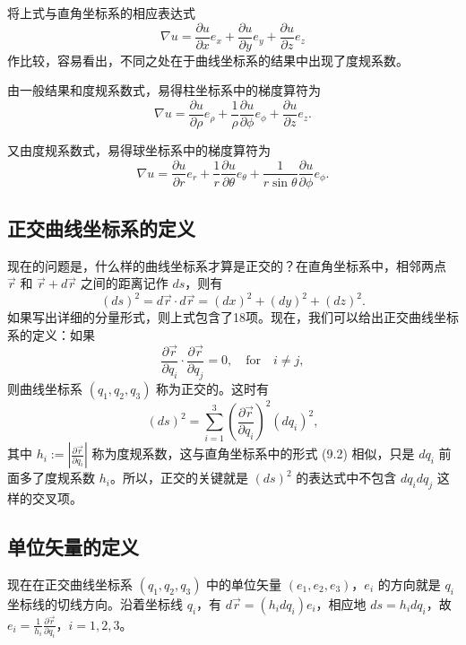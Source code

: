 将上式与直角坐标系的相应表达式
\begin{equation}
\nabla u = \frac{\partial u}{\partial x} e_x + \frac{\partial u}{\partial y} e_y + \frac{\partial u}{\partial z} e_z
\end{equation}
作比较，容易看出，不同之处在于曲线坐标系的结果中出现了度规系数。

由一般结果和度规系数式，易得柱坐标系中的梯度算符为
\begin{equation}
\nabla u = \frac{\partial u}{\partial \rho} e_\rho + \frac{1}{\rho} \frac{\partial u}{\partial \phi} e_\phi + \frac{\partial u}{\partial z} e_z.
\end{equation}

又由度规系数式，易得球坐标系中的梯度算符为
\begin{equation}
\nabla u = \frac{\partial u}{\partial r} e_r + \frac{1}{r} \frac{\partial u}{\partial \theta} e_\theta + \frac{1}{r \sin \theta} \frac{\partial u}{\partial \phi} e_\phi.
\end{equation}


\subsection{正交曲线坐标系的定义}

现在的问题是，什么样的曲线坐标系才算是正交的？在直角坐标系中，相邻两点 $\vec{r}$ 和 $\vec{r} + d\vec{r}$ 之间的距离记作 $ds$，则有
\[
(ds)^2 = d\vec{r} \cdot d\vec{r} = (dx)^2 + (dy)^2 + (dz)^2.
\]
如果写出详细的分量形式，则上式包含了18项。现在，我们可以给出正交曲线坐标系的定义：如果
\[
\frac{\partial \vec{r}}{\partial q_i} \cdot \frac{\partial \vec{r}}{\partial q_j} = 0, \quad \text{for} \quad i \neq j,
\]
则曲线坐标系 $(q_1, q_2, q_3)$ 称为正交的。这时有
\[
(ds)^2 = \sum_{i=1}^3 \left( \frac{\partial \vec{r}}{\partial q_i} \right)^2 (dq_i)^2,
\]
其中 $h_i := \left| \frac{\partial \vec{r}}{\partial q_i} \right|$ 称为度规系数，这与直角坐标系中的形式 (9.2) 相似，只是 $dq_i$ 前面多了度规系数 $h_i$。所以，正交的关键就是 $(ds)^2$ 的表达式中不包含 $dq_i dq_j$ 这样的交叉项。

\subsection{单位矢量的定义}

现在在正交曲线坐标系 $(q_1, q_2, q_3)$ 中的单位矢量 $(e_1, e_2, e_3)$，$e_i$ 的方向就是 $q_i$ 坐标线的切线方向。沿着坐标线 $q_i$，有 $d\vec{r} = (h_i dq_i) e_i$，相应地 $ds = h_i dq_i$，故 $e_i = \frac{1}{h_i} \frac{\partial \vec{r}}{\partial q_i}$，$i = 1, 2, 3$。

